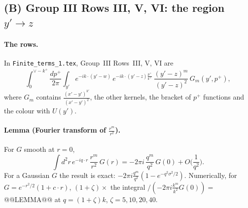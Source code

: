 \documentclass[10pt]{article}
\numberwithin{equation}{section}
\begin{document}
\subsection{(B) Group III Rows III, V, VI: the region \texorpdfstring{$y'\to z$}{y' -> z}}\label{sec:B}
\paragraph{The rows.} In \texttt{Finite\_terms\_1.tex}, Group~III Rows~III, V, VI are
\begin{equation*}
\int_0^{\vee-k^+}\frac{dp^+}{2\pi}\int_{y'}e^{-ik\cdot(y'-w)}\,e^{-ik\cdot(y'-z)\frac{p^+}{k^+}}\,\frac{(y'-z)^m}{(y'-z)^2}\,G_m(y',p^+),
\end{equation*}
where $G_m$ contains $\frac{(x'-y')^{k'}}{(x'-y')^2}$, the other kernels, the bracket of $p^+$ functions and the colour with $U(y')$.

\paragraph{Lemma (Fourier transform of $\frac{r^m}{r^2}$).} For $G$ smooth at $r=0$,
\begin{equation}
\int d^2r\,e^{-iq\cdot r}\,\frac{r^m}{r^2}\,G(r)=-2\pi i\,\frac{q^m}{q^2}\,G(0)+O\Big(\frac{1}{q^2}\Big).
\end{equation}
For a Gaussian $G$ the result is exact: $-2\pi i\frac{q^m}{q^2}(1-e^{-q^2\sigma^2/2})$. Numerically, for $G=e^{-r^2/2}(1+c\cdot r)$, $(1+\zeta)\times$ the integral $/(-2\pi i\frac{k^m}{k^2}G(0))=$ @@LEMMA@@ at $q=(1+\zeta)k$, $\zeta=5,10,20,40$.
\end{document}
